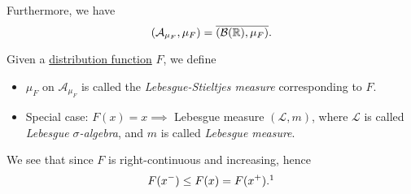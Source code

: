 Furthermore, we have
\[
	(\mathcal{A}_{\mu _F}, \mu _F) = \overline{(\mathcal{B} (\mathbb{\MakeUppercase{r}} ), \mu _F)}.
\]
\begin{definition}\label{def:Lebesgue-Stieltjes-measure}
	Given a \hyperref[def:distribution-function]{distribution function} \(F\), we define
	\begin{itemize}
		\item \(\mu _F\) on \(\mathcal{A} _{\mu _F}\) is called the \emph{Lebesgue-Stieltjes measure} corresponding to \(F\).
		\item Special case: \(F(x)=x\implies \) Lebesgue measure \((\mathcal{L} , m)\), where \(\mathcal{L} \) is called \emph{Lebesgue \(\sigma\)-algebra},
		      and \(m\) is called \emph{Lebesgue measure}.
	\end{itemize}
\end{definition}

\begin{note}
	We see that since \(F\) is right-continuous and increasing, hence
	\[
		F(x^-)\leq F(x) = F(x^+).\footnotemark
	\]
\end{note}

